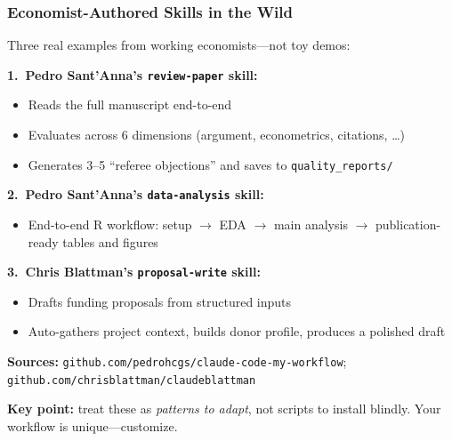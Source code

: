 \documentclass[10pt,english,aspectratio=169]{beamer}
\begin{document}
\begin{frame}
\frametitle{Economist-Authored Skills in the Wild}

Three real examples from working economists---not toy demos:

\vspace{0.3cm}

\textbf{1.\ Pedro Sant'Anna's \texttt{review-paper} skill:}
\begin{itemize}
    \item Reads the full manuscript end-to-end
    \item Evaluates across 6 dimensions (argument, econometrics, citations, \ldots)
    \item Generates 3--5 ``referee objections'' and saves to \texttt{quality\_reports/}
\end{itemize}

\vspace{0.15cm}

\textbf{2.\ Pedro Sant'Anna's \texttt{data-analysis} skill:}
\begin{itemize}
    \item End-to-end R workflow: setup $\to$ EDA $\to$ main analysis $\to$ publication-ready tables and figures
\end{itemize}

\vspace{0.15cm}

\textbf{3.\ Chris Blattman's \texttt{proposal-write} skill:}
\begin{itemize}
    \item Drafts funding proposals from structured inputs
    \item Auto-gathers project context, builds donor profile, produces a polished draft
\end{itemize}

\vspace{0.2cm}

\textbf{Sources:} \texttt{github.com/pedrohcgs/claude-code-my-workflow}; \texttt{github.com/chrisblattman/claudeblattman}

\vspace{0.1cm}

\textbf{Key point:} treat these as \textit{patterns to adapt}, not scripts to install blindly. Your workflow is unique---customize.
\end{frame}
\end{document}
